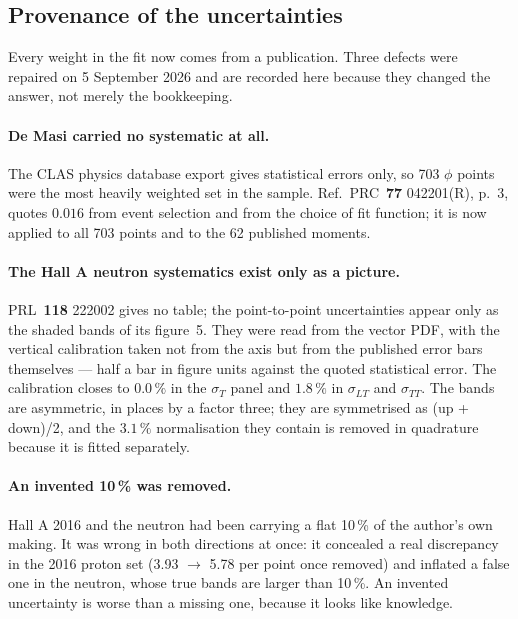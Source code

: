 \documentclass[11pt,a4paper]{article}
\newcommand{\sig}[1]{\sigma_{#1}}
\begin{document}
\begin{table}[htb]
\centering\small
\caption{The database and the fit.  A set marked $--$ is not fitted; its
$\chi^2$ is then a blind prediction.  CLAS12 cross sections are preliminary;
the published De Masi $\alpha$ are the same measurement as the $\phi$
distributions and would be double counting.}
\label{tab:sets}

\end{table}

\subsection{Provenance of the uncertainties}

Every weight in the fit now comes from a publication.  Three defects were
repaired on 5 September 2026 and are recorded here because they changed the
answer, not merely the bookkeeping.

\paragraph{De Masi carried no systematic at all.}  The CLAS physics database
export gives statistical errors only, so 703 $\phi$ points were the most
heavily weighted set in the sample.  Ref.~PRC~\textbf{77} 042201(R), p.~3,
quotes $0.016$ from event selection and from the choice of fit function; it is
now applied to all 703 points and to the 62 published moments.

\paragraph{The Hall A neutron systematics exist only as a picture.}
PRL~\textbf{118} 222002 gives no table; the point-to-point uncertainties appear
only as the shaded bands of its figure~5.  They were read from the vector PDF,
with the vertical calibration taken not from the axis but from the published
error bars themselves --- half a bar in figure units against the quoted
statistical error.  The calibration closes to $0.0\,\%$ in the $\sig{T}$ panel
and $1.8\,\%$ in $\sig{LT}$ and $\sig{TT}$.  The bands are asymmetric, in
places by a factor three; they are symmetrised as (up + down)/2, and the
$3.1\,\%$ normalisation they contain is removed in quadrature because it is
fitted separately.

\paragraph{An invented 10\,\% was removed.}  Hall A 2016 and the neutron had
been carrying a flat 10\,\% of the author's own making.  It was wrong in both
directions at once: it concealed a real discrepancy in the 2016 proton set
(3.93 $\to$ 5.78 per point once removed) and inflated a false one in the
neutron, whose true bands are larger than 10\,\%.  An invented uncertainty is
worse than a missing one, because it looks like knowledge.
\end{document}
